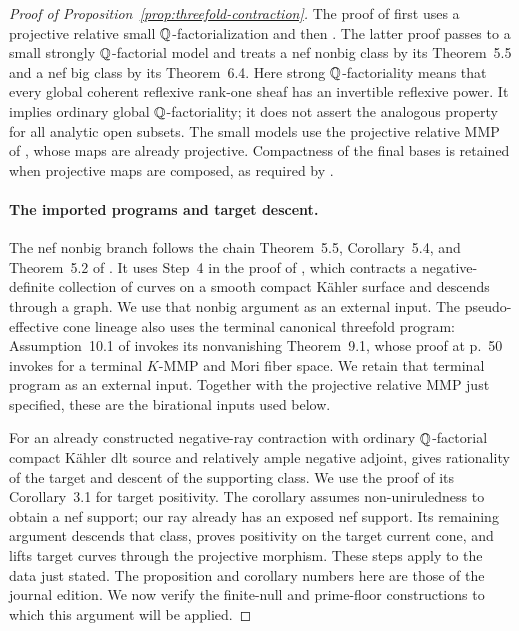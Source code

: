 \begin{proof}[Proof of Proposition~\ref{prop:threefold-contraction}]
The proof of
\cite[Theorem~5.5]{DasHaconPaun2024} first uses a projective relative
small \(\mathbb Q\)-factorialization and then
\cite[Theorem~1.7]{DasHacon2024}.  The latter proof passes to a small
strongly \(\mathbb Q\)-factorial model and treats a nef nonbig class by its
Theorem~5.5 and a nef big class by its Theorem~6.4.  Here strong
\(\mathbb Q\)-factoriality means that every global coherent reflexive rank-one
sheaf has an invertible reflexive power.  It implies ordinary global
\(\mathbb Q\)-factoriality; it does not assert the analogous property for
all analytic open subsets.  The small models use the projective relative
MMP of \cite[Proposition~2.26 and Lemma~2.27]{DasHacon2024}, whose maps
are already projective.  Compactness of the final bases is retained when
projective maps are composed, as required by
\cite[Remark~2.11]{DasHaconPaun2024}.

\paragraph{The imported programs and target descent.}
The nef nonbig branch follows the chain Theorem~5.5, Corollary~5.4,
and Theorem~5.2 of \cite{DasHacon2024}.  It uses Step~4 in the proof of
\cite[Theorem~1.4, p.~242]{HoeringPeternell2015}, which contracts a
negative-definite collection of curves on a smooth compact K\"ahler
surface and descends through a graph.  We use that nonbig argument as
an external input.  The pseudo-effective cone lineage also uses the
terminal canonical threefold program: Assumption~10.1 of
\cite{DasOu2022} invokes its nonvanishing Theorem~9.1, whose proof at
p.~50 invokes \cite[Theorem~1.1]{HoeringPeternell2015} for a terminal
\(K\)-MMP and Mori fiber space.  We retain that terminal program as
an external input.  Together with the projective relative MMP just
specified, these are the birational inputs used below.

For an already constructed negative-ray contraction with ordinary
\(\mathbb Q\)-factorial compact K\"ahler dlt source and relatively ample
negative adjoint, \cite[Proposition~3.1]{CampanaHoeringPeternell2016}
gives rationality of the target and descent of the supporting class.
We use the proof of its Corollary~3.1 for target positivity.  The
corollary assumes non-uniruledness to obtain a nef support; our ray
already has an exposed nef support.  Its remaining argument descends
that class, proves positivity on the target current cone, and lifts
target curves through the projective morphism.  These steps apply to
the data just stated.  The proposition and corollary numbers here are
those of the journal edition.  We now verify the finite-null and
prime-floor constructions to which this argument will be applied.


\end{proof}
